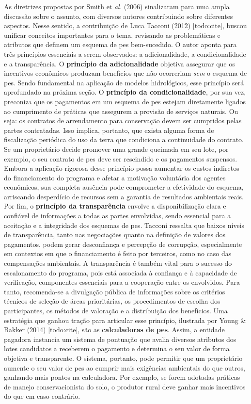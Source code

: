 \documentclass[./main.tex]{subfiles}
\begin{document}
\par As diretrizes propostas por Smith et \textit{al.} (2006) sinalizaram para uma ampla discussão sobre o assunto, com diversos autores contribuindo sobre diferentes aspectos. Nesse sentido, a contribuição de Luca Tacconi (2012) [todo:cite], buscou unificar conceitos importantes para o tema, revisando as problemáticas e atributos que definem um esquema de \acrshort{pes} bem-sucedido. O autor aponta para três princípios essenciais a serem observados: a adicionalidade, a condicionalidade e a transparência. O \textbf{princípio da adicionalidade} objetiva assegurar que os incentivos econômicos produzam benefícios que não ocorreriam \textit{sem} o esquema de \acrshort{pes}. Sendo fundamental na aplicação de modelos hidrológicos, esse princípio será aprofundado na próxima seção. O \textbf{princípio da condicionalidade}, por sua vez, preconiza que os pagamentos em um esquema de \acrshort{pes} estejam diretamente ligados ao cumprimento de práticas que assegurem a provisão de serviços naturais. Ou seja: os contratos de arrendamento para conservação devem ser cumpridos pelas partes contratadas. Isso implica, portanto, que exista alguma forma de fiscalização periódica do uso da terra que condiciona a continuidade do contrato. Se um proprietário decide promover uma grande queimada em seu lote, por exemplo, o seu contrato de \acrshort{pes} deve ser rescindido e os pagamentos suspensos. Embora a aplicação rigorosa desse princípio possa aumentar os custos indiretos do financiamento do programa e afetar a motivação voluntária dos agentes econômicos, sua completa ausência pode comprometer a efetividade do esquema, arriscando desperdício de recursos sem a garantia de resultados ambientais reais. Por fim, o \textbf{princípio da transparência} envolve a disponibilização clara e confiável de informações a todas as partes envolvidas, sendo essencial para a aceitação e a integridade dos esquemas de \acrshort{pes}. Tacconi ressalta que baixos níveis de transparência, tanto nas negociações quanto na definição de valores dos pagamentos, podem gerar desconfiança e percepção de corrupção, especialmente em contextos em que o financiamento é feito por terceiros, como no caso das compensações ambientais. A transparência é também vital para o sucesso do escalonamento do programa, pois está associada à confiança e à capacidade de verificação, componentes essenciais para a cooperação entre os envolvidos. Para tanto, recomenda-se a divulgação pública de informações sobre os critérios técnicos de seleção de áreas prioritárias, os procedimentos de escolha dos participantes, os métodos de valoração e a distribuição dos benefícios. Uma estratégia que ganhou tração para articular esse princípio, ilustrada por Young \& Bakker (2014) [todo:cite], são as \textbf{calculadoras de \acrshort{pes}}. Assim, a entidade pagadora instancia um sistema de pontuação que avalia diversos atributos dos lotes candidatos a receberem o pagamento e determina o seu valor de forma objetiva e transparente. O sistema, portanto, pode permitir que um proprietário aumente o seu valor de \acrshort{pes} ao cumprir mais exigências ambientais do que outros, ganhando mais pontos na calculadora. Por exemplo, se forem adotadas práticas de manejo conservacionista do solo, o produtor rural deve ganhar mais incentivos do que em caso contrário.  
\end{document}

